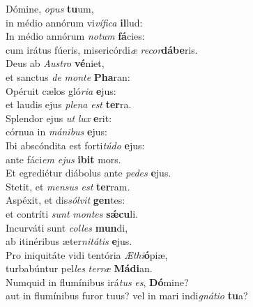 \evenverse Dómine, \textit{o}\textit{pus} \textbf{tu}um,~\*\\
\evenverse in médio annórum vi\textit{ví}\textit{fi}\textit{ca} \textbf{il}lud:\\
\oddverse In médio annórum \textit{no}\textit{tum} \textbf{fá}cies:~\*\\
\oddverse cum irátus fúeris, misericórdi\textit{æ} \textit{re}\textit{cor}\textbf{dá}\textbf{be}ris.\\
\evenverse Deus ab \textit{Au}\textit{stro} \textbf{vé}niet,~\*\\
\evenverse et sanctus \textit{de} \textit{mon}\textit{te} \textbf{Pha}ran:\\
\oddverse Opéruit cælos gló\textit{ri}\textit{a} \textbf{e}jus:~\*\\
\oddverse et laudis ejus \textit{ple}\textit{na} \textit{est} \textbf{ter}ra.\\
\evenverse Splendor ejus \textit{ut} \textit{lux} \textbf{e}rit:~\*\\
\evenverse córnua in \textit{má}\textit{ni}\textit{bus} \textbf{e}jus:\\
\oddverse Ibi abscóndita est forti\textit{tú}\textit{do} \textbf{e}jus:~\*\\
\oddverse ante fáci\textit{em} \textit{e}\textit{jus} \textbf{i}\textbf{bit} mors.\\
\evenverse Et egrediétur diábolus ante \textit{pe}\textit{des} \textbf{e}jus.~\*\\
\evenverse Stetit, et \textit{men}\textit{sus} \textit{est} \textbf{ter}ram.\\
\oddverse Aspéxit, et dis\textit{sól}\textit{vit} \textbf{gen}tes:~\*\\
\oddverse et contríti \textit{sunt} \textit{mon}\textit{tes} \textbf{sǽ}\textbf{cu}li.\\
\evenverse Incurváti sunt \textit{col}\textit{les} \textbf{mun}di,~\*\\
\evenverse ab itinéribus æter\textit{ni}\textit{tá}\textit{tis} \textbf{e}jus.\\
\oddverse Pro iniquitáte vidi tentória \textit{Æ}\textit{thi}\textbf{ó}piæ,~\*\\
\oddverse turbabúntur pel\textit{les} \textit{ter}\textit{ræ} \textbf{Má}\textbf{di}an.\\
\evenverse Numquid in flumínibus irá\textit{tus} \textit{es}, \textbf{Dó}mine?~\*\\
\evenverse aut in flumínibus furor tuus? vel in mari indi\textit{gná}\textit{ti}\textit{o} \textbf{tu}a?\\
